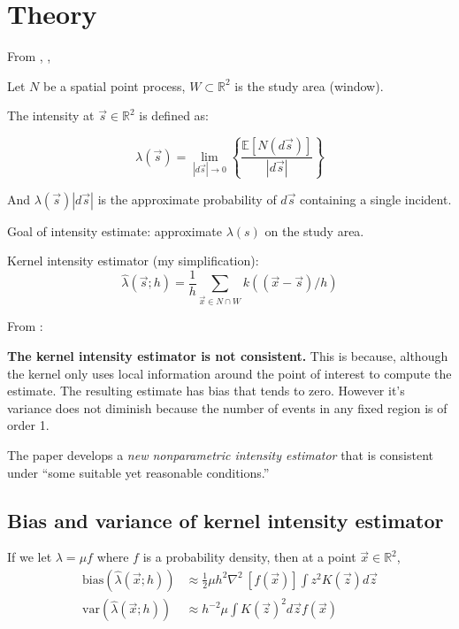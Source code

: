 


\section{Theory}

From \citet{diggle1988equivalence}, \citet{guan2008consistent}, \citet{wand1994kernel}

Let \(N\) be a spatial point process, \(W \subset \mathbb{R}^2 \) is the study area (window).

The intensity at \(\vec{s} \in \mathbb{R}^2\) is defined as:

\[
    \lambda (\vec{s}) = \lim_{|d\vec{s}| \to 0} \left\{ \frac{\mathbb{E}[N(d\vec{s})]}{|d\vec{s}|} \right\}
\]

And \(\lambda(\vec{s})|d\vec{s}|\) is the approximate probability of \(d\vec{s}\) containing a single incident.

Goal of intensity estimate: approximate \(\lambda(s)\) on the study area.

Kernel intensity estimator (my simplification):
\[
    \hat{\lambda}(\vec{s}; h) = \frac{1}{h} \sum_{\vec{x} \in N \cap W}{k((\vec{x}-\vec{s})/h)}
\]

From \citet{guan2008consistent}:

{
\color{red}
\textbf{The kernel intensity estimator is not consistent.}
This is because, although the kernel only uses local information around the point of interest to compute the estimate.
The resulting estimate has bias that tends to zero.
However it's variance does not diminish because the number of events in any fixed region is of order 1.
}

The paper develops a \textit{new nonparametric intensity estimator} that is consistent under ``some suitable yet reasonable conditions.''

\subsection{Bias and variance of kernel intensity estimator}

If we let \(\lambda = \mu f\) where \(f\) is a probability density, then at a point \(\vec{x} \in \mathbb{R}^2\),
\begin{align}
\mbox{bias}(\hat{\lambda}(\vec{x};h)) & \approx \frac{1}{2} \mu h^2 \nabla^2~\left[ f(\vec{x}) \right] \int {z^2 K(\vec{z}) d\vec{z}} \\
\mbox{var}(\hat{\lambda}(\vec{x};h)) & \approx h^{-2} \mu \int {K(\vec{z})^2d\vec{z}} f(\vec{x})
\end{align}

